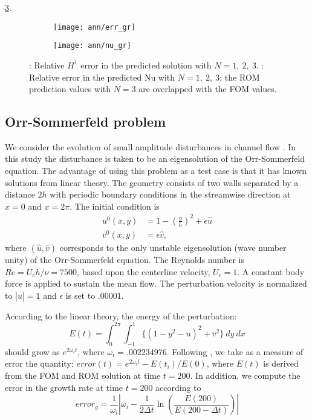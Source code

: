 \ref{fig:5}.  \begin{figure}[h]
     \centering
     \begin{subfigure}[b]{0.45\textwidth}
         \centering
         \texttt{[image: ann/err\_gr]}
         \caption{}
         \label{fig:3_a}
     \end{subfigure}
     \hfill
     \begin{subfigure}[b]{0.45\textwidth}
         \centering
         \texttt{[image: ann/nu\_gr]}
         \caption{}
         \label{fig:3_b}
     \end{subfigure}
     \caption{: Relative $H^1$ error in the predicted solution
     with $N=1,~2,~3$.  : Relative error in the predicted Nu
     with $N=1,~2,~3$; the ROM prediction values with $N=3$ are overlapped with
     the FOM values.} \label{fig:5}
\end{figure}

\subsection{Orr-Sommerfeld problem}
We consider the evolution of small amplitude disturbances in channel flow \cite{rai1991direct,malik1985spectral}.
In this study the disturbance is taken to be an eigensolution of the
Orr-Sommerfeld equation. The advantage of using this problem as a test case is
that it has known solutions from linear theory.  The geometry consists of two
walls separated by a distance $2h$ with periodic boundary conditions in the
streamwise direction at $x = 0$ and $x = 2\pi$. The initial condition is
\begin{align}
   u^0(x,y) &= 1-(\frac{y}{h})^2 + \epsilon \hat{u} \\ 
   v^0(x,y) &= \epsilon \hat{v},
\end{align}
where $(\hat{u}, \hat{v})$ corresponds to the only unstable eigensolution (wave number unity) of the
Orr-Sommerfeld equation. The Reynolds number is $Re = U_c h / \nu =  7500$, based upon the
centerline velocity, $U_c = 1$. A constant body force is applied to sustain the mean flow.
The perturbation velocity is normalized to $|\hat{u}| = 1$ and $\epsilon$ is set to $.00001$.

According to the linear theory, the energy of the perturbation:
\begin{equation}
   E(t) = \int^{2\pi}_0 \int^1_{-1} \{ (1-y^2-u)^2 + v^2 \} ~dy~dx
\end{equation}
should grow as $e^{2\omega_i t}$, where $\omega_i = .002234976$. Following \cite{malik1985spectral},
we take as a measure of error the quantity: $error(t) = e^{2\omega_i t} - E(t_i)/E(0)$, where $E(t)$ is derived from 
the FOM and ROM solution at time $t=200$. In addition, we compute the error
in the growth rate at time $t = 200$ according to
\begin{equation}
   error_g = \frac{1}{\omega_i} \left|\omega_i - \frac{1}{2\Delta t}\ln \left(\frac{E(200)}{E(200-\Delta t)}\right) \right|
\end{equation}

